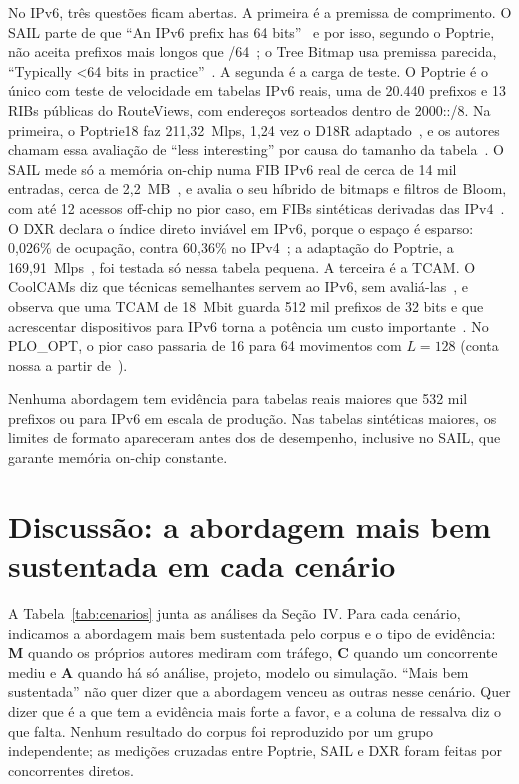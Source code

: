 \documentclass[conference,a4paper]{IEEEtran}
\begin{document}
No IPv6, três questões ficam abertas. A primeira é a premissa de comprimento. O SAIL parte de que ``An IPv6 prefix has 64
bits''~\cite[\S VII-A]{yang18} e por isso, segundo o Poptrie, não aceita prefixos mais longos que /64~\cite[\S4.10]{asai15};
o Tree Bitmap usa premissa parecida, ``Typically <64 bits in practice''~\cite[Tab.~3]{eath04}. A segunda é a carga de teste.
O Poptrie é o único com teste de velocidade em tabelas IPv6 reais, uma de 20.440 prefixos e 13 RIBs públicas do
RouteViews, com endereços sorteados dentro de 2000::/8. Na primeira, o Poptrie18 faz 211,32~Mlps, 1,24 vez o D18R
adaptado~\cite[\S4.10, Tab.~6]{asai15}, e os autores chamam essa avaliação de ``less interesting'' por causa do tamanho
da tabela~\cite[\S4.10]{asai15}. O SAIL mede só a memória on-chip numa
FIB IPv6 real de cerca de 14 mil entradas, cerca de 2,2~MB~\cite[\S VII-A]{yang18}, e avalia o seu híbrido de bitmaps e
filtros de Bloom, com até 12 acessos off-chip no pior caso, em FIBs sintéticas derivadas das IPv4~\cite[\S VII-C]{yang18}.
O DXR declara o índice direto inviável em IPv6, porque o espaço é esparso: 0,026\% de ocupação, contra 60,36\% no
IPv4~\cite[\S3]{zec12}; a adaptação do Poptrie, a 169,91~Mlps~\cite[\S4.10]{asai15}, foi testada só nessa tabela pequena. A
terceira é a TCAM. O CoolCAMs diz que técnicas semelhantes servem ao IPv6, sem avaliá-las~\cite[\S I]{zane03}, e observa que
uma TCAM de 18~Mbit guarda 512 mil prefixos de 32 bits e que acrescentar dispositivos para IPv6 torna a potência um custo
importante~\cite[\S II]{zane03}. No PLO\_OPT, o pior caso passaria de 16 para 64 movimentos com $L=128$ (conta nossa a partir
de~\cite[p.~37]{shah01}).

Nenhuma abordagem tem evidência para tabelas reais maiores que 532 mil prefixos ou para IPv6 em escala de produção. Nas
tabelas sintéticas maiores, os limites de formato apareceram antes dos de desempenho, inclusive no SAIL, que garante memória
on-chip constante.

\section{Discussão: a abordagem mais bem sustentada em cada cenário}

A Tabela~\ref{tab:cenarios} junta as análises da Seção~IV. Para cada cenário, indicamos a abordagem mais bem sustentada
pelo corpus e o tipo de evidência: \textbf{M} quando os próprios autores mediram com tráfego, \textbf{C} quando um concorrente
mediu e \textbf{A} quando há só análise, projeto, modelo ou simulação. ``Mais bem sustentada'' não quer dizer que a
abordagem venceu as outras nesse cenário. Quer dizer que é a que tem a evidência mais forte a favor, e a coluna de ressalva
diz o que falta. Nenhum resultado do corpus foi reproduzido por um grupo independente; as medições cruzadas entre Poptrie,
SAIL e DXR foram feitas por concorrentes diretos.
\end{document}
